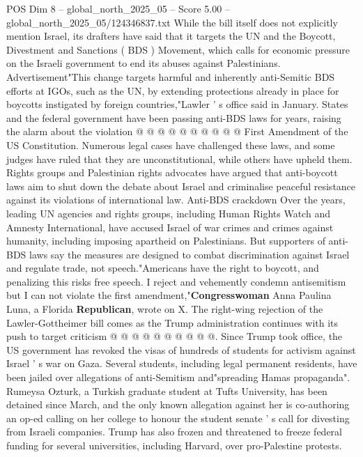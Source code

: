 \begin{textsample}{POS Dim 8 – global\_north\_2025\_05 – Score 5.00 – global\_north\_2025\_05/124346837.txt}
While the bill itself does not explicitly mention Israel, its drafters have said that it targets the UN and the Boycott, Divestment and Sanctions ( BDS ) Movement, which calls for economic pressure on the Israeli government to end its abuses against Palestinians.
Advertisement"This change targets harmful and inherently anti-Semitic BDS efforts at IGOs, such as the UN, by extending protections already in place for boycotts instigated by foreign countries,"Lawler ' s office said in January.
States and the federal government have been passing anti-BDS laws for years, raising the alarm about the violation @ @ @ @ @ @ @ @ @ @ First Amendment of the US Constitution.
Numerous legal cases have challenged these laws, and some judges have ruled that they are unconstitutional, while others have upheld them.
Rights groups and Palestinian rights advocates have argued that anti-boycott laws aim to shut down the debate about Israel and criminalise peaceful resistance against its violations of international law.
Anti-BDS crackdown Over the years, leading UN agencies and rights groups, including Human Rights Watch and Amnesty International, have accused Israel of war crimes and crimes against humanity, including imposing apartheid on Palestinians.
But supporters of anti-BDS laws say the measures are designed to combat discrimination against Israel and regulate trade, not speech."Americans have the right to boycott, and penalizing this risks free speech.
I reject and vehemently condemn antisemitism but I can not violate the first amendment,"\textbf{Congresswoman} Anna Paulina Luna, a Florida \textbf{Republican}, wrote on X.
The right-wing rejection of the Lawler-Gottheimer bill comes as the Trump administration continues with its push to target criticism @ @ @ @ @ @ @ @ @ @.
Since Trump took office, the US government has revoked the visas of hundreds of students for activism against Israel ' s war on Gaza.
Several students, including legal permanent residents, have been jailed over allegations of anti-Semitism and"spreading Hamas propaganda".
Rumeysa Ozturk, a Turkish graduate student at Tufts University, has been detained since March, and the only known allegation against her is co-authoring an op-ed calling on her college to honour the student senate ' s call for divesting from Israeli companies.
Trump has also frozen and threatened to freeze federal funding for several universities, including Harvard, over pro-Palestine protests.

\end{textsample}
